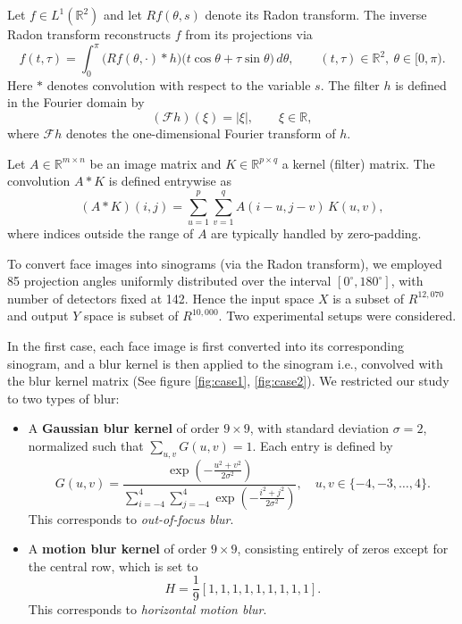 \documentclass[twoside,11pt]{article}
\begin{document}
\begin{definition}
Let \( f \in L^1(\mathbb{R}^2) \) and let \( Rf(\theta,s) \) denote its Radon transform.
The inverse Radon transform reconstructs \( f \) from its projections via
\[
f(t,\tau)
=
\int_{0}^{\pi}
\bigl(Rf(\theta,\cdot) * h\bigr)
\bigl(t\cos\theta + \tau\sin\theta\bigr)\, d\theta,
\qquad (t,\tau)\in\mathbb{R}^2,\ \theta\in[0,\pi).
\]
Here \( * \) denotes convolution with respect to the variable \( s \).
The filter \( h \) is defined in the Fourier domain by
\[
(\mathcal{F}h)(\xi)=|\xi|, \qquad \xi\in\mathbb{R},
\]
where \( \mathcal{F}h \) denotes the one-dimensional Fourier transform of \( h \).

\end{definition}



\begin{definition}
Let $A \in \mathbb{R}^{m \times n}$ be an image matrix and $K \in \mathbb{R}^{p \times q}$ 
a kernel (filter) matrix. The convolution $A * K$ is defined entrywise as
\[
(A * K)(i,j) = \sum_{u=1}^{p} \sum_{v=1}^{q} A(i-u,j-v) \, K(u,v),
\]
where indices outside the range of $A$ are typically handled by zero-padding.  
\end{definition}

\vspace{0.5em}
To convert face images into sinograms (via the Radon transform), we employed 85 projection angles uniformly distributed over the interval $[0^\circ, 180^\circ]$, with number of detectors fixed at 142. Hence the input space $X$ is a subset of  $R^{12,070}$ and output $Y$ space is subset of $R^{10,000}$.
Two experimental setups were considered.  

\vspace{0.5em}
In the first case, each face image is first converted into its corresponding sinogram, 
and a blur kernel is then applied to the sinogram i.e., convolved with the blur kernel matrix (See figure \ref{fig:case1}, \ref{fig:case2}). 
We restricted our study to two types of blur:

\vspace{0.5em}
\begin{itemize}
    \item A \textbf{Gaussian blur kernel} of order $9 \times 9$, with standard deviation
$\sigma = 2$, normalized such that $\sum_{u,v} G(u,v) = 1$. Each entry is defined by
\[
G(u,v)
=
\frac{\exp\!\left(-\frac{u^2+v^2}{2\sigma^2}\right)}
{\sum_{i=-4}^{4}\sum_{j=-4}^{4}
\exp\!\left(-\frac{i^2+j^2}{2\sigma^2}\right)},
\quad
u,v \in \{-4,-3,\dots,4\}.
\]
This corresponds to \emph{out-of-focus blur}.
    \vspace{0.4em}
    \item A \textbf{motion blur kernel} of order $9 \times 9$, consisting entirely of zeros 
    except for the central row, which is set to
    \[
    H = \frac{1}{9}[1,1,1,1,1,1,1,1,1].
    \]
    This corresponds to \emph{horizontal motion blur}.  
\end{itemize}
\end{document}
